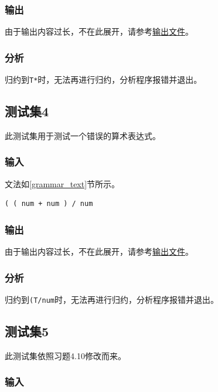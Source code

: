 \documentclass[lang=cn,11pt,a4paper,cite=authornum]{paper}
\begin{document}
\subsubsection{输出}

由于输出内容过长，不在此展开，请参考\href{run:../test/result3.txt}{输出文件}。

\subsubsection{分析}

归约到\texttt{T*}时，无法再进行归约，分析程序报错并退出。

\subsection{测试集4}

此测试集用于测试一个错误的算术表达式。

\subsubsection{输入}

文法如\ref{grammar_text}节所示。

\begin{code}
    \begin{verbatim}
( ( num + num ) / num
\end{verbatim}
\end{code}

\subsubsection{输出}

由于输出内容过长，不在此展开，请参考\href{run:../test/result4.txt}{输出文件}。

\subsubsection{分析}

归约到\texttt{(T/num}时，无法再进行归约，分析程序报错并退出。

\subsection{测试集5}

此测试集依照习题4.10修改而来。

\subsubsection{输入}
\end{document}
